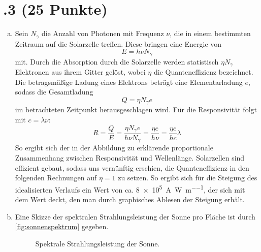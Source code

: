 \section*{\nr.3 \titthree (25 Punkte)}
\begin{enumerate}[(a)]
\item Sein $N_\gamma$ die Anzahl von Photonen mit Frequenz $\nu$, die in einem bestimmten Zeitraum auf die Solarzelle treffen. Diese bringen eine Energie von
\begin{equation}
E = h \nu N_\gamma
\end{equation}
mit. Durch die Absorption durch die Solarzelle werden statistisch $\eta N_\gamma$ Elektronen aus ihrem Gitter gelöst, wobei $\eta$ die Quanteneffizienz bezeichnet. Die betragsmäßige Ladung eines Elektrons beträgt eine Elementarladung $e$, sodass die Gesamtladung
\begin{equation}
Q = \eta N_\gamma e
\end{equation} 
im betrachteten Zeitpunkt herausgeschlagen wird.
Für die Responsivität folgt mit $c=\lambda \nu$:
\begin{equation}
R = \frac{Q}{E} = \frac{\eta N_\gamma e}{h \nu N_\gamma} = \frac{\eta e}{h \nu} = \frac{\eta e}{hc} \lambda
\end{equation}
So ergibt sich der in der Abbildung zu erklärende proportionale Zusammenhang zwischen Responsivität und Wellenlänge. Solarzellen sind effizient gebaut, sodass uns vernünftig erschien, die Quanteneffizienz in den folgenden Rechnungen auf $\eta = 1$ zu setzen. So ergibt sich für die Steigung des idealisierten Verlaufs ein Wert von ca. \SI{8e5}{\ampere\per\watt\per\meter}, der sich mit dem Wert deckt, den man durch graphisches Ablesen der Steigung erhält.
\item Eine Skizze der spektralen Strahlungsleistung der Sonne pro Fläche ist durch \vref{fig:sonnenspektrum} gegeben.
\begin{figure}[htbp]
\centering

\caption{Spektrale Strahlungsleistung der Sonne.}
\label{fig:sonnenspektrum}
\end{figure}


\end{enumerate}

